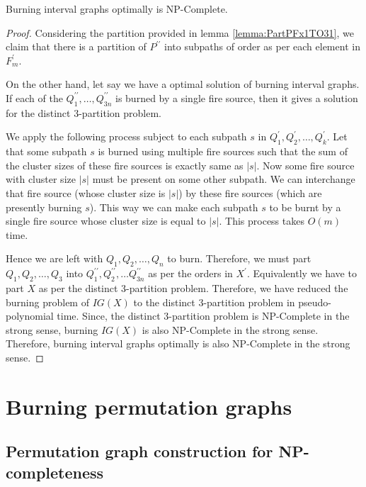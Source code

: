 \begin{theorem}\label{theorem:BIGNPCIG}
Burning interval graphs optimally is NP-Complete.
\end{theorem}

\begin{proof}
    Considering the partition provided in lemma \ref{lemma:PartPFx1TO31}, we claim that there is a partition of $P^{\prime\prime}$ into subpaths of order as per each element in $F_m^\prime$.
    
    On the other hand, let say we have a optimal solution of burning interval graphs. If each of the $Q_1^{\prime\prime},\dots,Q_{3n}^{\prime\prime}$ is burned by a single fire source, then it gives a solution for the distinct 3-partition problem.
    
    We apply the following process subject to each subpath $s$ in $Q_1^\prime,Q_2^\prime,\dots,Q_k^\prime$. Let that some subpath $s$ is burned using multiple fire sources such that the sum of the cluster sizes of these fire sources is exactly same as $|s|$. Now some fire source with cluster size $|s|$ must be present on some other subpath. We can interchange that fire source (whose cluster size is $|s|$) by these fire sources (which are presently burning $s$). This way we can make each subpath $s$ to be burnt by a single fire source whose cluster size is equal to $|s|$. This process takes $O(m)$ time.
    
    Hence we are left with $Q_1,Q_2,\dots,Q_n$ to burn. Therefore, we must part $Q_1,Q_2,\dots,Q_3$ into $Q^{\prime\prime}_1,Q^{\prime\prime}_2,\dots Q^{\prime\prime}_{3n}$ as per the orders in $X^\prime$. Equivalently we have to part $X$ as per the distinct 3-partition problem. Therefore, we have reduced the burning problem of $IG(X)$ to the distinct 3-partition problem in pseudo-polynomial time. Since, the distinct 3-partition problem is NP-Complete in the strong sense, burning $IG(X)$ is also NP-Complete in the strong sense. Therefore, burning interval graphs optimally is also NP-Complete in the strong sense.
\end{proof}

\section{Burning permutation graphs}\label{section:burn-permutation-graphs}

\subsection{Permutation graph construction for NP-completeness}

